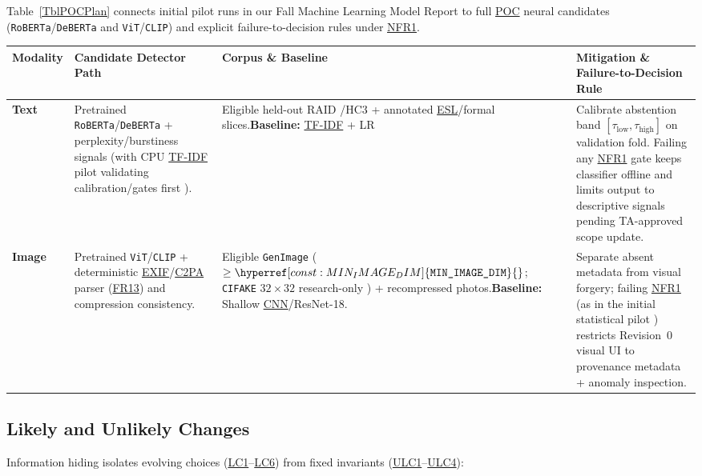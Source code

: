 \documentclass[11pt]{article}
\newcommand{\MinImageDim}{\hyperref[const:MIN_IMAGE_DIM]{\texttt{MIN\_\allowbreak{}IMAGE\_\allowbreak{}DIM}}}
\newcommand{\CNN}{\hyperlink{acr-cnn}{CNN}}
\newcommand{\CTwoPA}{\hyperlink{acr-c2pa}{C2PA}}
\newcommand{\ESL}{\hyperlink{acr-esl}{ESL}}
\newcommand{\EXIF}{\hyperlink{acr-exif}{EXIF}}
\newcommand{\POC}{\hyperlink{acr-poc}{POC}}
\newcommand{\TFIDF}{\hyperlink{acr-tfidf}{TF-IDF}}
\begin{document}
Table~\ref{TblPOCPlan} connects initial pilot runs in our Fall Machine Learning Model Report \cite{VerityMLReport2026} to full \POC{} neural candidates (\texttt{RoBERTa}/\texttt{DeBERTa} and \texttt{ViT}/\texttt{CLIP}) and explicit failure-to-decision rules under \hyperref[NFR1]{NFR1}.

{\small
\begin{tabularx}{\textwidth}{P{2.2cm} P{3.3cm} P{3.1cm} Y}
\caption{POC Candidate Detectors, Baselines, Corpora, and Failure Decision Rules} \label{TblPOCPlan}\\
\toprule
\textbf{Modality} & \textbf{Candidate Detector Path} & \textbf{Corpus \& Baseline} & \textbf{Mitigation \& Failure-to-Decision Rule}\\
\midrule
\textbf{Text} & Pretrained \texttt{RoBERTa}/\texttt{DeBERTa} + perplexity/burstiness signals (with CPU \TFIDF{} pilot validating calibration/gates first \cite{VerityMLReport2026}). & Eligible held-out RAID \cite{RaidBenchmark2024}/HC3 + annotated \ESL{}/formal slices.\newline \textbf{Baseline:} \TFIDF{} + LR & Calibrate abstention band $[\tau_{\text{low}},\tau_{\text{high}}]$ on validation fold. Failing any \hyperref[NFR1]{NFR1} gate keeps classifier offline and limits output to descriptive signals pending TA-approved scope update.\\
\midrule
\textbf{Image} & Pretrained \texttt{ViT}/\texttt{CLIP} + deterministic \EXIF{}/\CTwoPA{} parser (\hyperref[FR13]{FR13}) and compression consistency. & Eligible \texttt{GenImage} ($\ge \MinImageDim{}$; \texttt{CIFAKE} $32\times32$ research-only \cite{CIFAKE2023}) + recompressed photos.\newline \textbf{Baseline:} Shallow \CNN{}/ResNet-18. & Separate absent metadata from visual forgery; failing \hyperref[NFR1]{NFR1} (as in the initial statistical pilot \cite{VerityMLReport2026}) restricts Revision~0 visual UI to provenance metadata + anomaly inspection.\\
\bottomrule
\end{tabularx}
}

\subsection{Likely and Unlikely Changes}\label{subsec:likely-changes}

Information hiding isolates evolving choices (\hyperref[LC1]{LC1}--\hyperref[LC6]{LC6}) from fixed invariants (\hyperref[ULC1]{ULC1}--\hyperref[ULC4]{ULC4}):
\end{document}
